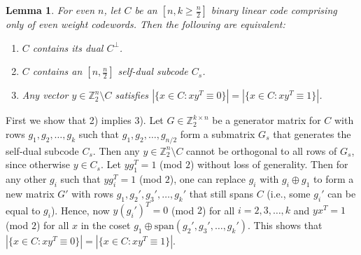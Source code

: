 \documentclass[twoside,romanappendices]{IEEEtran}
\newtheorem{lemma}[theorem]{Lemma}
\begin{document}
\begin{lemma}
\label{lem:C_self_dual}
For even $n$, let $C$ be an $[n,k \geq \frac{n}{2}]$ binary linear code comprising only of even weight codewords.
Then the following are equivalent:
\begin{enumerate}
    \item $C$ contains its dual $C^{\perp}$.
    \item $C$ contains an $[n,\frac{n}{2}]$ self-dual subcode $C_s$.
    \item Any vector $y \in \mathbb{Z}_2^n \setminus C$ satisfies $|\{ x \in C \colon xy^T \equiv 0 \}| = |\{ x \in C \colon xy^T \equiv 1 \}|$.
\end{enumerate}
\end{lemma}
\begin{IEEEproof}
First we show that 2) implies 3).
Let $G \in \mathbb{Z}_2^{k \times n}$ be a generator matrix for $C$ with rows $g_1,g_2,\ldots,g_k$ such that $g_1,g_2,\ldots,g_{n/2}$ form a submatrix $G_s$ that generates the self-dual subcode $C_s$.
Then any $y \in \mathbb{Z}_2^n \setminus C$ cannot be orthogonal to all rows of $G_s$, since otherwise $y \in C_s$.
Let $yg_1^T = 1$ (mod $2$) without loss of generality.
Then for any other $g_i$ such that $yg_i^T = 1$ (mod $2$), one can replace $g_i$ with $g_i \oplus g_1$ to form a new matrix $G'$ with rows $g_1,g_2',g_3',\ldots,g_k'$ that still spans $C$ (i.e., some $g_i'$ can be equal to $g_i$).
Hence, now $y(g_i')^T = 0$ (mod $2$) for all $i=2,3,\ldots,k$ and $yx^T = 1$ (mod $2$) for all $x$ in the coset $g_1 \oplus \text{span}(g_2',g_3',\ldots,g_k')$.
This shows that $|\{ x \in C \colon xy^T \equiv 0 \}| = |\{ x \in C \colon xy^T \equiv 1 \}|$.



\end{IEEEproof}
\end{document}
